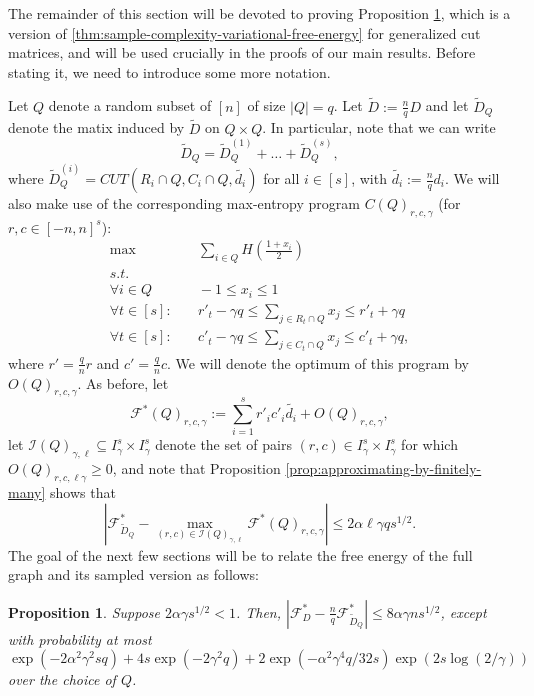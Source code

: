 \documentclass[final, 12pt]{colt2018}
\newcommand{\F}{\mathcal{F}}
\newcommand{\I}{\mathcal{I}}
\newtheorem{proposition}[theorem]{Proposition}
\theoremstyle{definition}
\theoremstyle{plain}
\begin{document}
The remainder of this section will be devoted to proving Proposition \ref{prop:sample-complexity-generalised-cut-matrices}, which is a version of \cref{thm:sample-complexity-variational-free-energy} for generalized cut matrices, and will be used crucially in the proofs of our main results. Before stating it, we need to introduce some more notation. 

Let $Q$ denote a random subset of $[n]$ of size $|Q|=q$. Let $\tilde{D}:=\frac{n}{q}D$ and let $\tilde{D}_{Q}$ denote the matix induced by $\tilde{D}$ on $Q\times Q$. In particular, note that we can write 
$$\tilde{D}_{Q} = \tilde{D}^{(1)}_{Q}+\dots + \tilde{D}^{(s)}_{Q},$$
where $\tilde{D}^{(i)}_{Q} = CUT(R_i \cap Q, C_i \cap Q, \tilde{d_i})$ for all $i \in [s]$, with $\tilde{d_i}:=\frac{n}{q}d_i$. We will also make use of the corresponding max-entropy program $C(Q)_{r,c,\gamma}$ (for $r,c \in [-n,n]^s$):  
\begin{align*}
\max & \quad \sum_{i\in Q}H\left(\frac{1+x_{i}}{2}\right)\\
s.t.\\
\forall i\in Q & \quad  -1\leq x_{i}\leq1\\
\forall t\in[s]: & \quad  r'_t-\gamma q\leq\sum_{j\in R_{t}\cap Q}x_{j}\leq r'_t+\gamma q\\
\forall t\in[s]: & \quad c'_t-\gamma q\leq\sum_{j\in C_{t}\cap Q}x_{j}\leq c'_t+\gamma q,
\end{align*}
where $r'= \frac{q}{n}r$ and $c'=\frac{q}{n}c$. We will denote the optimum of this program by $O(Q)_{r,c,\gamma}$. As before, let 
$$ \F^*(Q)_{r,c,\gamma} := \sum_{i=1}^{s}r'_ic'_i\tilde{d_i} + O(Q)_{r,c,\gamma},$$
let $\I(Q)_{\gamma,\ell} \subseteq I_{\gamma}^{s}\times I_{\gamma}^{s}$ denote the set of pairs $(r,c)\in I_{\gamma}^{s}\times I_{\gamma}^{s}$ for which $O(Q)_{r,c,\ell \gamma} \geq 0$, and note that Proposition \ref{prop:approximating-by-finitely-many} shows that      
\begin{equation}
\label{eqn:approx-by-finite-sample}
\left|\F^{*}_{\tilde{D}_{Q}} - \max_{(r,c)\in \I(Q)_{\gamma,\ell}}\F^*(Q)_{r,c,\gamma} \right| \leq 2\alpha \ell \gamma qs^{1/2}. 
\end{equation}
The goal of the next few sections will be to relate the free energy of the full
graph and its sampled version as follows:
\begin{proposition}
\label{prop:sample-complexity-generalised-cut-matrices}
Suppose $2\alpha \gamma s^{1/2} < 1$. Then, $\left|\F^{*}_{D} - \frac{n}{q}\F^{*}_{\tilde{D}_Q}\right|\leq 8\alpha \gamma n s^{1/2}$, except with probability at most $\exp(-2\alpha^2 \gamma ^2 sq) + 4s\exp(-2\gamma^2 q) + 2\exp(-\alpha^2 \gamma ^4 q/32s)\exp(2s\log(2/\gamma))$ over the choice of $Q$. 
\end{proposition}
\end{document}

